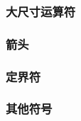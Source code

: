 \subsubsection{大尺寸运算符}
\SymbolTable{
    \SymbolLine{\sum}{\bigcup}{\bigvee}{\bigoplus}
    \SymbolLine{\prod}{\bigcap}{\bigwedge}{\bigotimes}
    \SymbolLine{\coprod}{\bigsqcup}{}{\bigodot}
    \SymbolLine{\int}{\oint}{}{\biguplus}
}

\subsubsection{箭头}
\SymbolTable{
    \SymbolText{\leftarrow}{\gets} & \Symbol{\longleftarrow} & \Symbol{\uparrow} & {} \\
    \SymbolText{\rightarrow}{\to} & \Symbol{\longrightarrow} & \Symbol{\downarrow} & {} \\
    \SymbolLine{\leftrightarrow}{\longleftrightarrow}{\updownarrow}{}
    \SymbolLine{\Leftarrow}{\Longleftarrow}{\Uparrow}{}
    \SymbolLine{\Rightarrow}{\Longrightarrow}{\Downarrow}{}
    \SymbolLine{\Leftrightarrow}{\Longleftrightarrow}{\Updownarrow}{}
    \SymbolLine{\mapsto}{\longmapsto}{\nearrow}{}
    \SymbolLine{\hookleftarrow}{\hookrightarrow}{\searrow}{}
    \SymbolLine{\leftharpoonup}{\rightharpoonup}{\swarrow}{}
    \SymbolLine{\leftharpoondown}{\rightharpoondown}{\nwarrow}{}
    \SymbolLine{\rightleftharpoons}{\iff}{\leadsto}{}
}

\subsubsection{定界符}
\SymbolTable{
    \SymbolLine{(}{)}{\uparrow}{\Uparrow}
    \SymbolText{[}{\lbrack} & \SymbolText{]}{\rbrack} & \Symbol{\downarrow} & \Symbol{\Downarrow} \\
    \SymbolText{\{}{\lbrace} & \SymbolText{\}}{\rbrace} & \Symbol{\updownarrow} & \Symbol{\Updownarrow} \\
    \Symbol{\langle} & \Symbol{\rangle} & \SymbolText{|}{\vert} & \SymbolText{\|}{\Vert} \\
    \SymbolLine{\lfloor}{\rfloor}{\lceil}{\rceil}
    \SymbolLine{/}{\backslash}{}{}
}

\subsubsection{其他符号}


